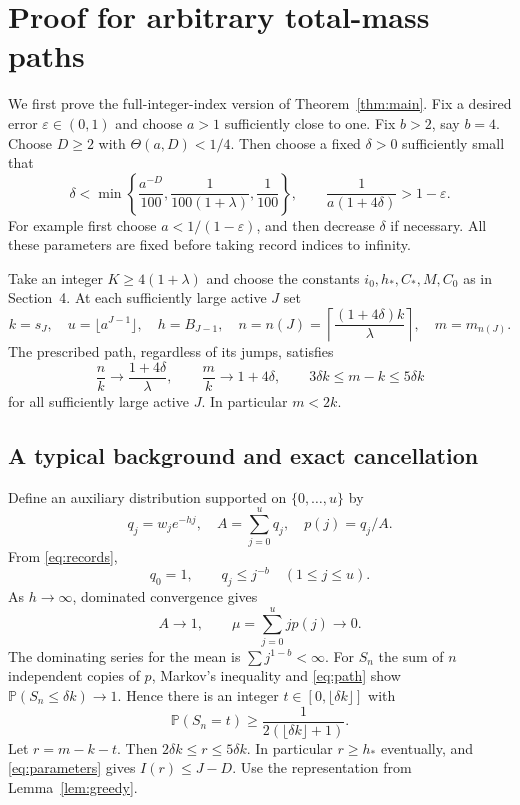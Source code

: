 \documentclass[11pt]{article}
\theoremstyle{remark}\newtheorem{remark}[theorem]{Remark}
\newcommand{\Pp}{\mathbb P}
\begin{document}
\section{Proof for arbitrary total-mass paths}
We first prove the full-integer-index version of Theorem~\ref{thm:main}.
Fix a desired error $\varepsilon\in(0,1)$ and choose $a>1$ sufficiently
close to one. Fix $b>2$, say $b=4$. Choose $D\ge2$ with
$\Theta(a,D)<1/4$. Then choose a fixed $\delta>0$ sufficiently small that
\begin{equation}\label{eq:parameters}
 \delta<\min\left\{\frac{a^{-D}}{100},\frac1{100(1+\lambda)},\frac1{100}\right\},
 \qquad \frac1{a(1+4\delta)}>1-\varepsilon.
\end{equation}
For example first choose $a<1/(1-\varepsilon)$, and then decrease $\delta$
if necessary. All these parameters are fixed before taking record indices
to infinity.

Take an integer $K\ge4(1+\lambda)$ and choose the constants $i_0,h_*,C_*,M,C_0$
as in Section~4. At each sufficiently large active $J$ set
\begin{equation}\label{eq:choice}
 k=s_J,\quad u=\lfloor a^{J-1}\rfloor,\quad h=B_{J-1},\quad
 n=n(J)=\left\lceil\frac{(1+4\delta)k}{\lambda}\right\rceil,
 \quad m=m_{n(J)}.
\end{equation}
The prescribed path, regardless of its jumps, satisfies
\begin{equation}\label{eq:path}
 \frac nk\longrightarrow\frac{1+4\delta}{\lambda},\qquad
 \frac mk\longrightarrow1+4\delta,
 \qquad 3\delta k\le m-k\le5\delta k
\end{equation}
for all sufficiently large active $J$. In particular $m<2k$.

\subsection{A typical background and exact cancellation}
Define an auxiliary distribution supported on $\{0,\ldots,u\}$ by
\[
 q_j=w_je^{-hj},\quad A=\sum_{j=0}^{u}q_j,\quad p(j)=q_j/A.
\]
From \eqref{eq:records},
\[
 q_0=1,\qquad q_j\le j^{-b}\quad(1\le j\le u).
\]
As $h\to\infty$, dominated convergence gives
\begin{equation}\label{eq:auxmean}
 A\to1,\qquad \mu=\sum_{j=0}^{u}j p(j)\to0.
\end{equation}
The dominating series for the mean is $\sum j^{1-b}<\infty$.
For $S_n$ the sum of $n$ independent copies of $p$, Markov's inequality and
\eqref{eq:path} show $\Pp(S_n\le\delta k)\to1$. Hence there is an integer
$t\in[0,\lfloor\delta k\rfloor]$ with
\begin{equation}\label{eq:atom}
 \Pp(S_n=t)\ge\frac1{2(\lfloor\delta k\rfloor+1)}.
\end{equation}
Let $r=m-k-t$. Then $2\delta k\le r\le5\delta k$. In particular $r\ge h_*$
eventually, and \eqref{eq:parameters} gives $I(r)\le J-D$.
Use the representation from Lemma~\ref{lem:greedy}.
\end{document}
